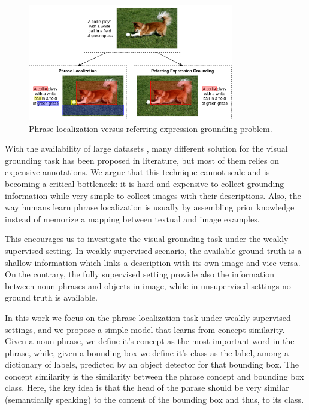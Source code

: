 \begin{figure}
  \centering
  \includegraphics[width=0.8\textwidth]{figures/dog-playing-with-ball.png}
  \caption[Phrase localization versus referring expression grounding
  problem]{Phrase localization versus referring expression grounding
  problem.}
  \label{fig:dog-playing-with-ball}
\end{figure}

With the availability of large datasets
\cite{plummer2015flickr30k,kazemzadeh2014referitgame}, many different
solution for the visual grounding task has been proposed in
literature, but most of them relies on expensive annotations. We argue
that this technique cannot scale and is becoming a critical
bottleneck: it is hard and expensive to collect grounding information
while very simple to collect images with their descriptions. Also, the
way humans learn phrase localization is usually by assembling prior
knowledge instead of memorize a mapping between textual and image
examples.

This encourages us to investigate the visual grounding task under the
weakly supervised setting. In weakly supervised scenario, the
available ground truth is a shallow information which links a
description with its own image and vice-versa. On the contrary, the
fully supervised setting provide also the information between noun
phrases and objects in image, while in unsupervised settings no ground
truth is available.

In this work we focus on the phrase localization task under weakly
supervised settings, and we propose a simple model that learns from
concept similarity. Given a noun phrase, we define it's concept as the
most important word in the phrase, while, given a bounding box we
define it's class as the label, among a dictionary of labels,
predicted by an object detector for that bounding box. The concept
similarity is the similarity between the phrase concept and bounding
box class. Here, the key idea is that the head of the phrase should be
very similar (semantically speaking) to the content of the bounding
box and thus, to its class. 

